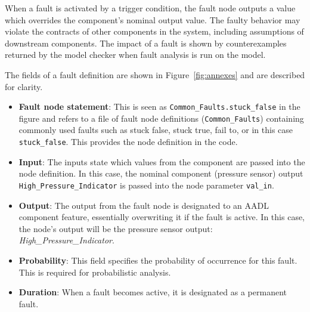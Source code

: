 When a fault is activated by a trigger condition, the fault node outputs a value which overrides the component's nominal output value. The faulty behavior may violate the contracts of other components in the system, including assumptions of downstream components. The impact of a fault is shown by counterexamples returned by the model checker when fault analysis is run on the model.

The fields of a fault definition are shown in Figure~\ref{fig:annexes} and are described for clarity.
\begin{itemize}
\item \textbf{Fault node statement}: This is seen as \texttt{Common\_Faults.stuck\_false} in the figure and refers to a file of fault node definitions (\texttt{Common\_Faults}) containing commonly used faults such as stuck false, stuck true, fail to, or in this case \texttt{stuck\_false}. This provides the node definition in the \lustre code.
\item \textbf{Input}: The inputs state which values from the component are passed into the node definition. In this case, the nominal component (pressure sensor) output \texttt{High\_Pressure\_Indicator} is passed into the node parameter \texttt{val\_in}. 
\item \textbf{Output}: The output from the fault node is designated to an AADL component feature, essentially overwriting it if the fault is active. In this case, the node's output will be the pressure sensor output: \textit{High\_Pressure\_Indicator}. 
\item \textbf{Probability}: This field specifies the probability of occurrence for this fault. This is required for probabilistic analysis.
\item \textbf{Duration}: When a fault becomes active, it is designated as a permanent fault. 
\end{itemize}

